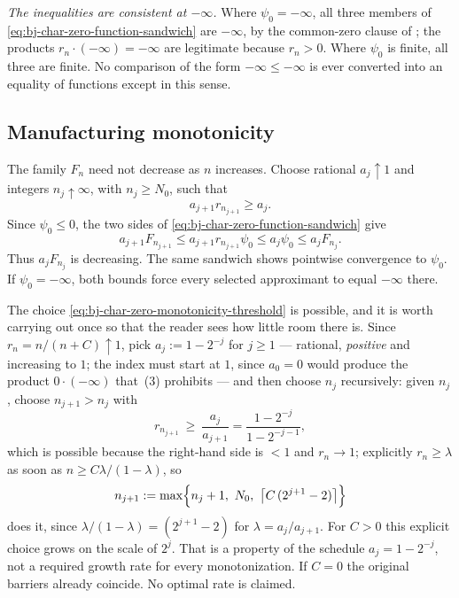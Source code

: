 \emph{The inequalities are consistent at $-\infty$.}  Where
$\psi_0=-\infty$, all three members of
\eqref{eq:bj-char-zero-function-sandwich} are $-\infty$, by the
common-zero clause of ; the products
$r_n\cdot(-\infty)=-\infty$ are legitimate because $r_n>0$.  Where
$\psi_0$ is finite, all three are finite.  No comparison of the form
$-\infty\le-\infty$ is ever converted into an equality of functions except
in this sense.

\subsection{Manufacturing monotonicity}
\label{sec:ch44-monotonization}

The family $F_n$ need not decrease as $n$ increases.
Choose rational $a_j\uparrow1$ and integers $n_j\uparrow\infty$, with
$n_j\ge N_0$, such that
\[
                         a_{j+1}r_{n_{j+1}}\ge a_j.
\tag{44.27}\label{eq:bj-char-zero-monotonicity-threshold}
\]
Since $\psi_0\le0$, the two sides of
\eqref{eq:bj-char-zero-function-sandwich} give
\[
 a_{j+1}F_{n_{j+1}}
 \le a_{j+1}r_{n_{j+1}}\psi_0
 \le a_j\psi_0
 \le a_jF_{n_j}.
\tag{44.28}\label{eq:bj-char-zero-monotone-chain}
\]
Thus $a_jF_{n_j}$ is decreasing.
The same sandwich shows pointwise convergence to $\psi_0$.
If $\psi_0=-\infty$, both bounds force every selected approximant to equal
$-\infty$ there.

The choice \eqref{eq:bj-char-zero-monotonicity-threshold} is possible, and
it is worth carrying out once so that the reader sees how little room there
is.  Since $r_n=n/(n+C)\uparrow1$, pick $a_j:=1-2^{-j}$ for $j\geq1$ ---
rational, \emph{positive} and increasing to $1$; the index must start at
$1$, since $a_0=0$ would produce the product $0\cdot(-\infty)$ that
\,(3) prohibits --- and then choose $n_j$ recursively: given $n_j$,
choose $n_{j+1}>n_j$ with
\[
 r_{n_{j+1}}\ \ge\ \frac{a_j}{a_{j+1}}
 =\frac{1-2^{-j}}{1-2^{-j-1}},
\]
which is possible because the right-hand side is $<1$ and
$r_n\to1$; explicitly $r_n\ge\lambda$ as soon as
$n\ge C\lambda/(1-\lambda)$, so
\[
 n_{j+1}
 :=\max\Bigl\{n_j+1,\ N_0,\
  \bigl\lceil C\,(2^{j+1}-2)\bigr\rceil\Bigr\}
\]
does it, since $\lambda/(1-\lambda)=(2^{j+1}-2)$ for
$\lambda=a_j/a_{j+1}$.  For $C>0$ this explicit choice grows on the scale of $2^j$.
That is a property of the schedule $a_j=1-2^{-j}$, not a required
growth rate for every monotonization.  If $C=0$ the original barriers
already coincide.  No optimal rate is claimed.


